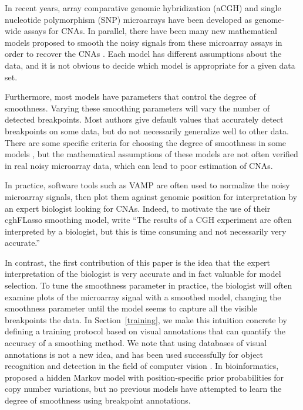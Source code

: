 \documentclass{bioinfo}
\begin{document}
In recent years, array comparative genomic hybridization (aCGH) and
single nucleotide polymorphism (SNP) microarrays have been developed
as genome-wide assays for CNAs. In parallel, there have been many new
mathematical models proposed to smooth the noisy signals from these
microarray assays in order to recover the CNAs
\citep{glad,cghseg,dnacopy,cghFLasso,haarseg,fused-lasso-path}.  Each model
has different assumptions about the data, and it is not obvious to
decide which model is appropriate for a given data set.

Furthermore, most models have parameters that control the degree
of smoothness. Varying these smoothing parameters will vary the number
of detected breakpoints. Most authors give default values that
accurately detect breakpoints on some data, but do not necessarily
generalize well to other data. There are some specific criteria for
choosing the degree of smoothness in some models
\citep{lavielle2005,mBIC,penalized-cna}, but the mathematical
assumptions of these models are not often verified in real noisy
microarray data, which can lead to poor estimation of CNAs.

In practice, software tools such as VAMP \citep{vamp} are often used to
normalize the noisy microarray signals, then plot them
 against genomic position for interpretation
by an expert biologist looking for CNAs. Indeed, to motivate the use
of their cghFLasso smoothing model, \cite{cghFLasso} write ``The
results of a CGH experiment are often interpreted by a biologist, but
this is time consuming and not necessarily very accurate.''

In contrast, the first contribution of this paper is the idea that the
expert interpretation of the biologist is very accurate and in fact
valuable for model selection. To tune the smoothness parameter in
practice, the biologist will often examine plots of the microarray
signal with a smoothed model, changing the smoothness parameter until
the model seems to capture all the visible breakpoints the data. In
Section~\ref{training}, we make this intuition concrete by defining a
training protocol based on visual annotations that can
quantify the accuracy of a smoothing method. We note that using
databases of visual annotations is not a new idea, and has been used
successfully for object recognition and detection in the field of
computer vision \citep{labelme}. In bioinformatics, \cite{shah}
proposed a hidden Markov model with position-specific prior
probabilities for copy number variations, but no previous models have
attempted to learn the degree of smoothness using breakpoint
annotations.
\end{document}
